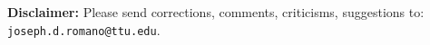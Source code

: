 \noindent
{\bf Disclaimer:} 
Please send corrections, comments, criticisms, suggestions to:
{\tt joseph.d.romano@ttu.edu}.
